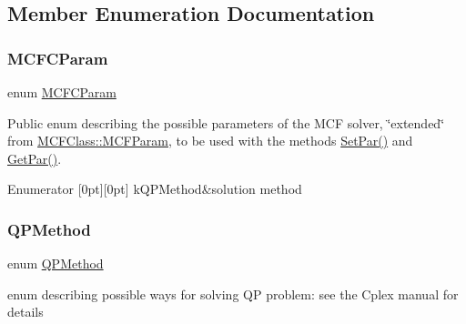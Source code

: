 \subsection{Member Enumeration Documentation}
\mbox{\label{class_m_c_f_cplex_a9a6371c21653d570fd947d9d1f7e0d73}} 
\subsubsection{\texorpdfstring{M\+C\+F\+C\+Param}{MCFCParam}}
{\footnotesize\ttfamily enum \mbox{\hyperlink{class_m_c_f_cplex_a9a6371c21653d570fd947d9d1f7e0d73}{M\+C\+F\+C\+Param}}}

Public enum describing the possible parameters of the M\+CF solver, \char`\"{}extended\char`\"{} from \mbox{\hyperlink{class_m_c_f_class_af6e60cb841150361862d6b895c523e0a}{M\+C\+F\+Class\+::\+M\+C\+F\+Param}}, to be used with the methods \mbox{\hyperlink{class_m_c_f_cplex_a12105bbd99b8b7ad7efae3bb0c222b3c}{Set\+Par()}} and \mbox{\hyperlink{class_m_c_f_cplex_aebb293732f2fd2767e9ebc5e8ccae338}{Get\+Par()}}. \begin{DoxyEnumFields}{Enumerator}
[0pt][0pt]{}\mbox{\label{class_m_c_f_cplex_a9a6371c21653d570fd947d9d1f7e0d73abf82103223f68a3b9aed4bb634c35b45}} 
k\+Q\+P\+Method&solution method \\
\hline

\end{DoxyEnumFields}
\mbox{\label{class_m_c_f_cplex_a2defda2978e2e664be97e83bab34ce8f}} 
\subsubsection{\texorpdfstring{Q\+P\+Method}{QPMethod}}
{\footnotesize\ttfamily enum \mbox{\hyperlink{class_m_c_f_cplex_a2defda2978e2e664be97e83bab34ce8f}{Q\+P\+Method}}}

enum describing possible ways for solving QP problem\+: see the Cplex manual for details 

